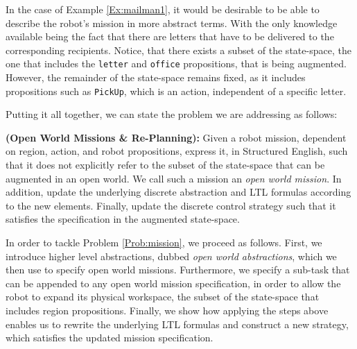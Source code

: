 In the case of Example \ref{Ex:mailman1}, it would be desirable to be able to describe the robot's mission in more abstract terms. With the only knowledge available being the fact that there are letters that have to be delivered to the corresponding recipients. Notice, that there exists a subset of the state-space, the one that includes the \texttt{letter} and \texttt{office} propositions, that is being augmented. However, the remainder of the state-space remains fixed, as it includes propositions such as \texttt{PickUp}, which is an action, independent of a specific letter. 

Putting it all together, we can state the problem we are addressing as follows:

\begin{myProblem}\label{Prob:mission}
	\textbf{(Open World Missions \& Re-Planning):} 
	Given a robot mission, dependent on region, action, and robot propositions, express it, in Structured English, such that it does not explicitly refer to the subset of the state-space that can be augmented in an open world. We call such a mission an \emph{open world mission}. In addition, update the underlying discrete abstraction and LTL formulas according to the new elements. Finally, update the discrete control strategy such that it satisfies the specification in the augmented state-space.
\end{myProblem}

In order to tackle Problem \ref{Prob:mission}, we proceed as follows. First, we introduce higher level abstractions, dubbed \emph{open world abstractions}, which we then use to specify open world missions. Furthermore, we specify a sub-task that can be appended to any open world mission specification, in order to allow the robot to expand its physical workspace, the subset of the state-space that includes region propositions. Finally, we  show how applying the steps above enables us to rewrite the underlying LTL formulas and construct a new strategy, which satisfies the updated mission specification.

